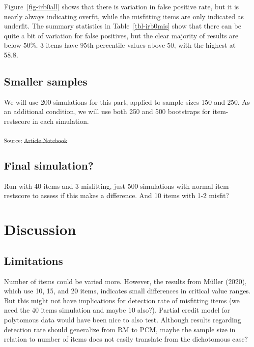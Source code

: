 \documentclass[
  letterpaper,
  DIV=11,
  numbers=noendperiod]{scrartcl}
\begin{document}
\begin{table}
\begin{minipage}{\linewidth}
{}

\end{minipage}%

\end{table}%

Figure~\ref{fig-irb0all} shows that there is variation in false positive
rate, but it is nearly always indicating overfit, while the misfitting
items are only indicated as underfit. The summary statistics in
Table~\ref{tbl-irb0mis} show that there can be quite a bit of variation
for false positives, but the clear majority of results are below 50\%. 3
items have 95th percentile values above 50, with the highest at 58.8.

\subsection{Smaller samples}\label{smaller-samples}

We will use 200 simulations for this part, applied to sample sizes 150
and 250. As an additional condition, we will use both 250 and 500
bootstraps for item-restscore in each simulation.

\textsubscript{Source:
\href{https://pgmj.github.io/rasch_itemfit/index.qmd.html}{Article
Notebook}}

\subsection{Final simulation?}\label{final-simulation}

Run with 40 items and 3 misfitting, just 500 simulations with normal
item-restscore to assess if this makes a difference. And 10 items with
1-2 misfit?

\section{Discussion}\label{discussion}

\subsection{Limitations}\label{limitations}

Number of items could be varied more. However, the results from Müller
(2020), which use 10, 15, and 20 items, indicates small differences in
critical value ranges. But this might not have implications for
detection rate of misfitting items (we need the 40 items simulation and
maybe 10 also?). Partial credit model for polytomous data would have
been nice to also test. Although results regarding detection rate should
generalize from RM to PCM, maybe the sample size in relation to number
of items does not easily translate from the dichotomous case?
\end{document}
